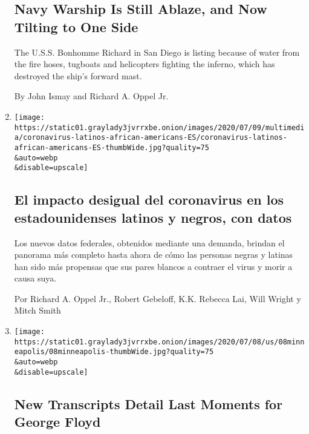 \begin{enumerate}
  \hypertarget{navy-warship-is-still-ablaze-and-now-tilting-to-one-side}{%
  \subsection{Navy Warship Is Still Ablaze, and Now Tilting to One
  Side}\label{navy-warship-is-still-ablaze-and-now-tilting-to-one-side}}

  The U.S.S. Bonhomme Richard in San Diego is listing because of water
  from the fire hoses, tugboats and helicopters fighting the inferno,
  which has destroyed the ship's forward mast.

  By John Ismay and Richard A. Oppel Jr.
\item
  \href{/es/interactive/2020/07/09/espanol/mundo/coronavirus-latinos-africanoamericanos-datos.html}{}

  \texttt{[image: https://static01.graylady3jvrrxbe.onion/images/2020/07/09/multimedia/coronavirus-latinos-african-americans-ES/coronavirus-latinos-african-americans-ES-thumbWide.jpg?quality=75\\\&auto=webp\\\&disable=upscale]}

  \hypertarget{el-impacto-desigual-del-coronavirus-en-los-estadounidenses-latinos-y-negros-con-datos}{%
  \subsection{El impacto desigual del coronavirus en los estadounidenses
  latinos y negros, con
  datos}\label{el-impacto-desigual-del-coronavirus-en-los-estadounidenses-latinos-y-negros-con-datos}}

  Los nuevos datos federales, obtenidos mediante una demanda, brindan el
  panorama más completo hasta ahora de cómo las personas negras y
  latinas han sido más propensas que sus pares blancos a contraer el
  virus y morir a causa suya.

  Por Richard A. Oppel Jr., Robert Gebeloff, K.K. Rebecca Lai, Will
  Wright y Mitch Smith
\item
  \href{/2020/07/08/us/george-floyd-body-camera-transcripts.html}{}

  \texttt{[image: https://static01.graylady3jvrrxbe.onion/images/2020/07/08/us/08minneapolis/08minneapolis-thumbWide.jpg?quality=75\\\&auto=webp\\\&disable=upscale]}

  \hypertarget{new-transcripts-detail-last-moments-for-george-floyd}{%
  \subsection{New Transcripts Detail Last Moments for George
  Floyd}\label{new-transcripts-detail-last-moments-for-george-floyd}}


\end{enumerate}
